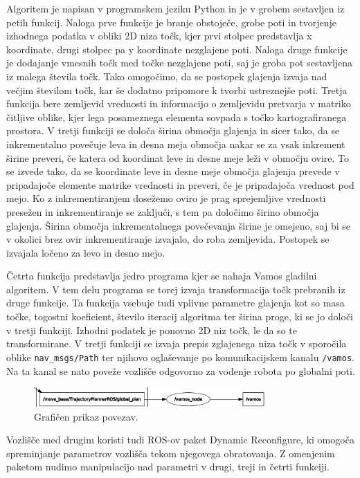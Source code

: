 \documentclass[final,5p,times,twocolumn]{elsarticle}
\begin{document}
Algoritem je napisan v programskem jeziku Python in je v grobem sestavljen iz petih funkcij. Naloga prve funkcije je branje obstoječe, grobe poti in tvorjenje izhodnega podatka v obliki 2D niza točk, kjer prvi stolpec predstavlja x koordinate, drugi stolpec pa y koordinate nezglajene poti. Naloga druge funkcije je dodajanje vmesnih točk med točke nezglajene poti, saj je groba pot sestavljena iz malega števila točk. Tako omogočimo, da se postopek glajenja izvaja nad večjim številom točk, kar še dodatno pripomore k tvorbi ustreznejše poti. Tretja funkcija bere zemljevid vrednosti in informacijo o zemljevidu pretvarja v matriko čitljive oblike, kjer lega posameznega elementa sovpada s točko kartografiranega prostora. V tretji funkciji se določa širina območja glajenja in sicer tako, da se inkrementalno povečuje leva in desna meja območja nakar se za vsak inkrement širine preveri, če katera od koordinat leve in desne meje leži v območju ovire. To se izvede tako, da se koordinate leve in desne meje območja glajenja prevede v pripadajoče elemente matrike vrednosti in preveri, če je pripadajoča vrednost pod mejo. Ko z inkrementiranjem dosežemo oviro je prag sprejemljive vrednosti presežen in inkrementiranje se zaključi, s tem pa določimo širino območja glajenja. Širina območja inkrementalnega povečevanja širine je omejeno, saj bi se v okolici brez ovir inkrementiranje izvajalo, do roba zemljevida. Postopek se izvajala ločeno za levo in desno mejo.

Četrta funkcija predstavlja jedro programa kjer se nahaja Vamos gladilni algoritem. V tem delu programa se torej izvaja transformacija točk prebranih iz druge funkcije. Ta funkcija vsebuje tudi vplivne parametre glajenja kot so masa točke, togostni koeficient, število iteracij algoritma ter širina proge, ki se jo določi v tretji funkciji. Izhodni podatek je ponovno 2D niz točk, le da so te transformirane. V tretji funkciji se izvaja prepis zglajenega niza točk v sporočila oblike \verb|nav_msgs/Path| ter njihovo oglaševanje po komunikacijskem kanalu \verb|/vamos|. Na ta kanal se nato poveže vozlišče odgovorno za vodenje robota po globalni poti.
\begin{figure}[H]
	\centering
	\includegraphics[width=8.9cm]{slika7.png}
	\caption{Grafičen prikaz povezav.}
	\label{fig:slika}
\end{figure}
Vozlišče med drugim koristi tudi ROS-ov paket Dynamic Reconfigure, ki omogoča spreminjanje parametrov vozlišča tekom njegovega obratovanja. Z omenjenim paketom nudimo manipulacijo nad parametri v drugi, treji in četrti funkciji.
\end{document}
